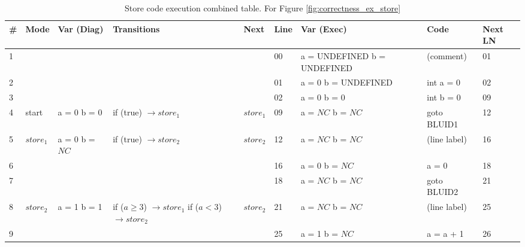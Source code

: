 \begin{table}[htcb]
	\caption{Store code execution combined table. For Figure \ref{fig:correctness_ex_store}}
	\centering
	\tablefontsize
		\begin{tabular}{|p{} | p{} | p{} | p{} | p{} | p{} | p{} | p{} | p{} |}
			\hline
			\textbf{\#} & \textbf{Mode} 		&	\textbf{Var (Diag)} 		& 	\textbf{Transitions} 		& 	\textbf{Next}		&	\textbf{Line}		&	\textbf{Var (Exec)	}	&	\textbf{Code}	&	\textbf{Next LN} \\
			\hline			
			1&					&								&								&						&	00					& 	a = UNDEFINED \newline	b = UNDEFINED	&	(comment)		&	01	\\
			\hline
			2&					&								&								&						&	01					&	a = 0 \newline b = UNDEFINED	&	int a = 0				&	02	\\
			\hline
			3&					&								&								&						&	02					&	a = 0 \newline b = 0		&	int b = 0					& 	09	\\
			\hline
			4&start				&	a = 0 \newline b = 0		&	if (true) $\rightarrow store_1$	& $store_1$			&	09					&	a = $NC$ \newline b = $NC$	&	goto BLUID1					&	12	\\
			\hline
			5&$store_1$			&	a = 0 \newline b = $NC$		&	if (true) $\rightarrow store_2$ & $store_2$			&	12					&	a = $NC$ \newline b = $NC$	&	(line label)				&	16	\\
			\hline
			6&					&								&								&						&	16					&	a = 0 \newline b = $NC$		&	a = 0						&	18	\\
			\hline
			7&					&								&								&						&	18					&	a = $NC$ \newline b = $NC$	&	goto BLUID2					&	21	\\
			\hline	
			8&$store_2$			&	a = 1	\newline b = 1		&	if ($a \geq 3$) $\rightarrow store_1$ \newline
																	if ($a < 3$) $\rightarrow store_2$ &	$store_2$	&	21					&	a = $NC$ \newline b = $NC$	&	(line label)				&	25	\\
			\hline
			9&					&								&								&						&	25					&	a = 1 \newline b = $NC$		&		a = a + 1				&	26	\\

\end{tabular}
\end{table}
